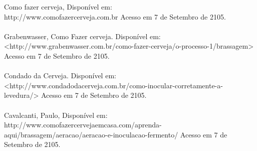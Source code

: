 Como fazer cerveja, Disponível em:\\ http://www.comofazercerveja.com.br
Acesso em 7 de Setembro de 2105.
\\ \\
Grabenwasser, Como Fazer cerveja. Disponível em:\\<http://www.grabenwasser.com.br/como-fazer-cerveja/o-processo-1/brassagem>
Acesso em 7 de Setembro de 2105.
\\ \\
Condado da Cerveja. Disponível em:\\<http://www.condadodacerveja.com.br/como-inocular-corretamente-a-levedura/>
 Acesso em 7 de Setembro de 2105.
\\ \\
Cavalcanti, Paulo, Disponível em:\\http://www.comofazercervejaemcasa.com/aprenda-aqui/brassagem/aeracao/aeracao-e-inoculacao-fermento/ Acesso em 7 de Setembro de 2105.
